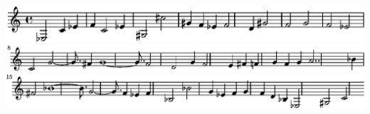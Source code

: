 \includegraphics{png-19-05-2020-12-04-20-1}%
\ifx\betweenLilyPondSystem \undefined
  \linebreak
\else
  \expandafter{}%
\fi
\includegraphics{png-19-05-2020-12-04-20-2}%
\ifx\betweenLilyPondSystem \undefined
  \linebreak
\else
  \expandafter{}%
\fi
\includegraphics{png-19-05-2020-12-04-20-3}%
